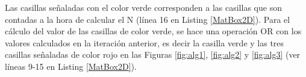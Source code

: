 Las casillas señaladas con el color verde corresponden a las casillas que son contadas a la hora de calcular el N (línea 16 en Listing \ref{MatBox2D}). Para el cálculo del valor de las casillas de color verde, se hace una operación OR con los valores calculados en la iteración anterior, es decir la casilla verde y las tres casillas señaladas de color rojo en las Figuras \ref{fig:alg1}, \ref{fig:alg2} y \ref{fig:alg3} (ver líneas 9-15 en Listing \ref{MatBox2D}).